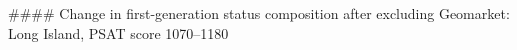 #### Change in first-generation status composition after excluding Geomarket: Long Island, PSAT score 1070–1180
